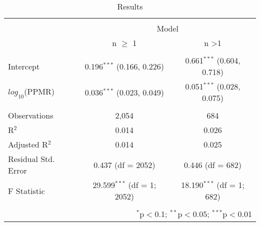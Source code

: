 
\begin{table}[!htbp] \centering 
  \caption{Results} 
  \label{} 
\begin{tabular}{@{\extracolsep{5pt}}lcc} 
\\[-1.8ex]\hline 
\hline \\[-1.8ex] 
 & \multicolumn{2}{c}{Model} \\ 
\cline{2-3} 
 & n $\geq$ 1 & n \textgreater 1 \\ 
\hline \\[-1.8ex] 
 Intercept & 0.196$^{***}$ (0.166, 0.226) & 0.661$^{***}$ (0.604, 0.718) \\ 
  $log_{10}$(PPMR) & 0.036$^{***}$ (0.023, 0.049) & 0.051$^{***}$ (0.028, 0.075) \\ 
 \hline \\[-1.8ex] 
Observations & 2,054 & 684 \\ 
R$^{2}$ & 0.014 & 0.026 \\ 
Adjusted R$^{2}$ & 0.014 & 0.025 \\ 
Residual Std. Error & 0.437 (df = 2052) & 0.446 (df = 682) \\ 
F Statistic & 29.599$^{***}$ (df = 1; 2052) & 18.190$^{***}$ (df = 1; 682) \\ 
\hline 
\hline \\[-1.8ex] 
\multicolumn{3}{r}{$^{*}$p$<$0.1; $^{**}$p$<$0.05; $^{***}$p$<$0.01} \\ 
\end{tabular} 
\end{table} 
